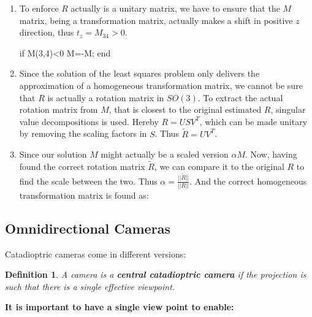 \documentclass[10pt,a4paper]{scrartcl}
\newtheorem{define}{Definition}
\begin{document}
\begin{multicols*}{2}
\begin{itemize}
\begin{enumerate}
\item To enforce $R$ actually is a unitary matrix, we have to ensure that the $M$ matrix, being a transformation matrix, actually makes a shift in positive $z$ direction, thus $t_z=M_{34}>0$.

\begin{TPMatlab}
if M(3,4)<0
    M=-M; 
end
\end{TPMatlab}

\item Since the solution of the least squares problem only delivers the approximation of a homogeneous transformation matrix, we cannot be sure that $R$ is actually a rotation matrix in $SO(3)$. To extract the actual rotation matrix from $M$, that is closest to the original estimated $R$, singular value decompositions is used. Hereby $R=USV^T$, which can be made unitary by removing the scaling factors in $S$. Thus $\tilde{R}=UV^T$.

\item Since our solution $M$ might actually be a scaled version $\alpha M$. Now, having found the correct rotation matrix $\tilde{R}$, we can compare it to the original $R$ to find the scale between the two. Thus $\alpha = \frac{||\tilde{R}||}{||R||}$. And the correct homogeneous transformation matrix is found as:

\end{enumerate}
\end{itemize}

\subsection{Omnidirectional Cameras}


Catadioptric cameras come in different versions:

\begin{minipage}[b]{0.45\linewidth}
\end{minipage}
\hfill
\begin{minipage}[b]{0.45\linewidth}
\end{minipage}

\begin{define}
A camera is a \textbf{central catadioptric camera} if the projection is such that there is a single effective viewpoint.
\end{define}

\textbf{It is important to have a single view point to enable:}


\end{multicols*}
\end{document}
